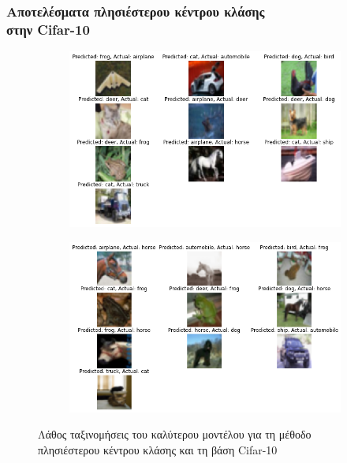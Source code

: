 \documentclass{beamer}
\begin{document}
\begin{frame}
\frametitle{Αποτελέσματα πλησιέστερου κέντρου κλάσης\\στην Cifar-10}

\begin{figure}[H]
    \centering

    \begin{subfigure}[t]{0.48\linewidth}
    \includegraphics[width=\linewidth]{cifar/wrong_results_knn_1.png}
    \end{subfigure}
    \begin{subfigure}[t]{0.48\linewidth}
    \includegraphics[width=\linewidth]{cifar/wrong_results_knn_2.png}
    \end{subfigure}

    \caption{Λάθος ταξινομήσεις του καλύτερου μοντέλου για τη μέθοδο
    πλησιέστερου κέντρου κλάσης και τη βάση Cifar-10}
    \label{fig:cifar_wrong_nc}
\end{figure}

\end{frame}
\end{document}
